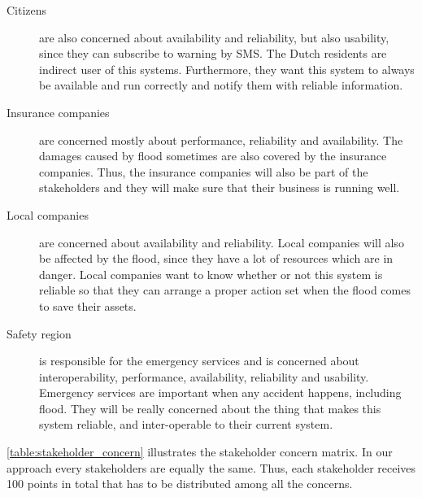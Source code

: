 \begin{description}
\item[Citizens] are also concerned about availability and reliability, but also usability, since they can subscribe to warning by SMS. The Dutch residents are indirect user of this systems. Furthermore, they want this system to always be available and run correctly and notify them with reliable information.

\item[Insurance companies] are concerned mostly about performance, reliability and availability. The damages caused by flood sometimes are also covered by the insurance companies. Thus, the insurance companies will also be part of the stakeholders and they will make sure that their business is running well.

\item[Local companies] are concerned about availability and reliability. Local companies will also be affected by the flood, since they have a lot of resources which are in danger. Local companies want to know whether or not this system is reliable so that they can arrange a proper action set when the flood comes to save their assets.

\item[Safety region] is responsible for the emergency services and is concerned about interoperability, performance, availability, reliability and usability. Emergency services are important when any accident happens, including flood. They will be really concerned about the thing that makes this system reliable, and inter-operable to their current system.
\end{description}

\autoref{table:stakeholder_concern} illustrates the stakeholder concern matrix. In our approach every stakeholders are equally the same. Thus, each stakeholder receives 100 points in total that has to be distributed among all the concerns.

